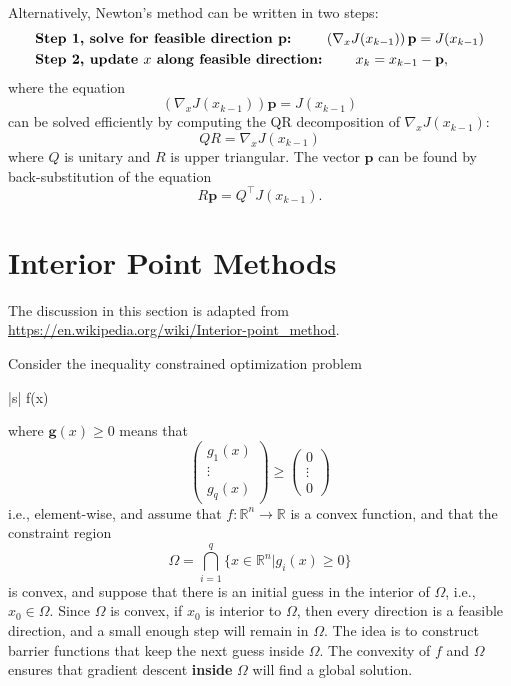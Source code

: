 \documentclass{article}
\newcommand{\gbf}{\mathbf{g}}
\begin{document}
Alternatively, Newton's method can be written in two steps:
\begin{align*}
&\text{\bf Step 1,~solve for feasible direction $\mathbf{p}$:~} \qquad	\left(\nabla_x J(x_{k-1})\right) \mathbf{p} = J(x_{k-1}) \\
&\text{\bf Step 2, update $x$ along feasible direction:~} \qquad x_k = x_{k-1} - \mathbf{p},
\end{align*}
where the equation
\[
\left(\nabla_x J(x_{k-1})\right) \mathbf{p} = J(x_{k-1})
\]
can be solved efficiently by computing the QR decomposition of $\nabla_x J(x_{k-1})$:
\[
QR = \nabla_x J(x_{k-1})
\]
where $Q$ is unitary and $R$ is upper triangular.  The vector $\mathbf{p}$ can be found by back-substitution of the equation
\[
R\mathbf{p} = Q^\top J(x_{k-1}).
\]


\section{Interior Point Methods}

The discussion in this section is adapted from \url{https://en.wikipedia.org/wiki/Interior-point_method}.

Consider the inequality constrained optimization problem
			\begin{mini*}|s|
				{}{f(x)}{}{}
				\addConstraint{\gbf(x) \geq 0}
			\end{mini*}
			where $\gbf(x) \geq 0$ means that
			\[
				\begin{pmatrix}
			    	g_1(x)\\
			    	\vdots\\
			    	g_q(x)
			  	\end{pmatrix} 
			  	\geq \begin{pmatrix} 
		 				0 \\ \vdots \\ 0
					 \end{pmatrix}
			\]
			i.e., element-wise,
	and assume that $f:\mathbb{R}^n\to\mathbb{R}$ is a convex function, and that the constraint region
	\[
		\Omega = \bigcap_{i=1}^q \{x\in\mathbb{R}^n | g_i(x) \geq 0\}
	\]
	is convex, and suppose that there is an initial guess in the interior of $\Omega$, i.e., $x_0\in\Omega$. Since $\Omega$ is convex, if $x_0$ is interior to $\Omega$, then every direction is a feasible direction, and a small enough step will remain in $\Omega$.  The idea is to construct barrier functions that keep the next guess inside $\Omega$.  The convexity of $f$ and $\Omega$ ensures that gradient descent {\bf inside} $\Omega$ will find a global solution.
	
\end{document}
